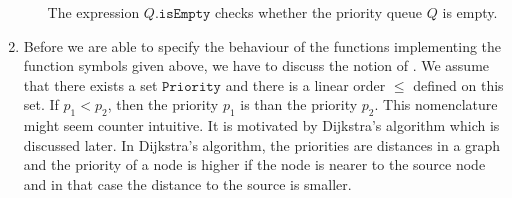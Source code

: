 \begin{Definition}
\begin{enumerate}
\begin{enumerate}
              The expression $Q.\mathtt{isEmpty}$ checks whether the priority queue $Q$ is empty.
        \end{enumerate}
\item Before we are able to specify the behaviour of the functions implementing the function symbols
      given above, we have to discuss the notion of .  We assume that there exists
      a set $\mathtt{Priority}$ and there is a linear order $\leq$ defined on this set.
      If  $p_1 < p_2$, then the priority $p_1$ is  than the priority $p_2$.  This
      nomenclature might seem counter intuitive.  It is motivated by 
      Dijkstra's algorithm which is discussed later.  In Dijkstra's algorithm, the priorities are
      distances in a graph and the priority of a node is higher if the node is nearer to the source
      node and in that case the distance to the source is smaller.


\end{enumerate}
\end{Definition}
